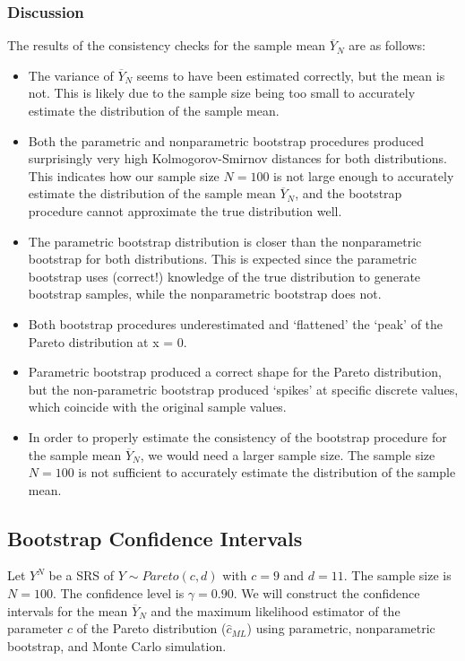 \documentclass{article}
\begin{document}
\subsubsection{Discussion}

The results of the consistency checks for the sample mean \(\overline{Y}_N\) are as follows:

\begin{itemize}
  \item The variance of \(\overline{Y}_N\) seems to have been estimated correctly, but the mean is not. This is likely due to the sample size being too small to accurately estimate the distribution of the sample mean.
  \item Both the parametric and nonparametric bootstrap procedures produced surprisingly very high Kolmogorov-Smirnov distances for both distributions. This indicates how our sample size \(N = 100\) is not large enough to accurately estimate the distribution of the sample mean \(\overline{Y}_N\), and the bootstrap procedure cannot approximate the true distribution well.
  \item The parametric bootstrap distribution is closer than the nonparametric bootstrap for both distributions. This is expected since the parametric bootstrap uses (correct!) knowledge of the true distribution to generate bootstrap samples, while the nonparametric bootstrap does not.
  \item Both bootstrap procedures underestimated and `flattened' the `peak' of the Pareto distribution at x = 0.
  \item Parametric bootstrap produced a correct shape for the Pareto distribution, but the non-parametric bootstrap produced `spikes' at specific discrete values, which coincide with the original sample values.
  \item In order to properly estimate the consistency of the bootstrap procedure for the sample mean \(\overline{Y}_N\), we would need a larger sample size. The sample size \(N = 100\) is not sufficient to accurately estimate the distribution of the sample mean.
\end{itemize}

\subsection{Bootstrap Confidence Intervals}

Let \(Y^N\) be a SRS of \(Y \sim Pareto(c, d)\) with \(c = 9\) and \(d = 11\). The sample size is \(N = 100\). The confidence level is \(\gamma = 0.90\). We will construct the confidence intervals for the mean \(\overline{Y}_N\) and the maximum likelihood estimator of the parameter \(c\) of the Pareto distribution (\(\hat{c}_{ML}\)) using parametric, nonparametric bootstrap, and Monte Carlo simulation.
\end{document}
